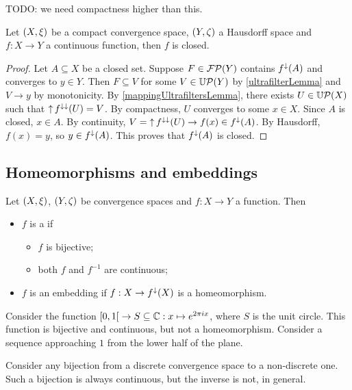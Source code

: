 TODO: we need compactness higher than this.
\begin{lemma}
Let $\sSet{X,\xi}$ be a compact convergence space, $\sSet{Y,\zeta}$ a Hausdorff space and $f: X\to Y$ a continuous function, then $f$ is closed.
\end{lemma}
\begin{proof}
Let $A\subseteq X$ be a closed set. Suppose $F\in\operatorname{\mathcal{FP}}(Y)$ contains $f^\downarrow(A)$ and converges to $y\in Y$. Then $F\subseteq V$ for some $V\in\operatorname{\mathbb{U}\mathcal{P}}(Y)$ by \ref{ultrafilterLemma} and $V\to y$ by monotonicity. By \ref{mappingUltrafiltersLemma}, there exists $U\in \operatorname{\mathbb{U}\mathcal{P}}(X)$ such that $\operatorname{\uparrow} f^{\downarrow\downarrow}(U) = V$. By compactness, $U$ converges to some $x\in X$. Since $A$ is closed, $x\in A$. By continuity, $V = \operatorname{\uparrow} f^{\downarrow\downarrow}(U) \to f(x)\in f^\downarrow(A)$. By Hausdorff, $f(x) = y$, so $y\in f^\downarrow(A)$. This proves that $f^\downarrow(A)$ is closed.
\end{proof}

\subsection{Homeomorphisms and embeddings}
\begin{definition}
Let $\sSet{X,\xi}$, $\sSet{Y,\zeta}$ be convergence spaces and $f: X\to Y$ a function. Then
\begin{itemize}
\item $f$ is a  if
\begin{itemize}
\item $f$ is bijective;
\item both $f$ and $f^{-1}$ are continuous;
\end{itemize}
\item $f$ is an embedding if $f: X\to f^\downarrow(X)$ is a homeomorphism.
\end{itemize}
\end{definition}

\begin{example}
Consider the function $\interval[co]{0,1} \to S\subseteq\C: x\mapsto e^{2\pi i x}$, where $S$ is the unit circle. This function is bijective and continuous, but not a homeomorphism. Consider a sequence approaching $1$ from the lower half of the plane.

Consider any bijection from a discrete convergence space to a non-discrete one. Such a bijection is always continuous, but the inverse is not, in general.
\end{example}

